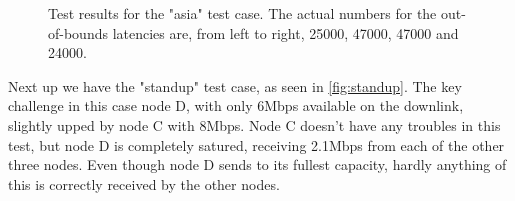 \begin{figure}
\begin{subfigure}[t]{.48\textwidth}
    \end{subfigure}
    \caption{Test results for the "asia" test case. The actual numbers for the out-of-bounds latencies are, from left to right, 25000, 47000, 47000 and 24000.}
    \label{fig:asia-bitrate}
\end{figure}

Next up we have the "standup" test case, as seen in \autoref{fig:standup}. The key challenge in this case node D, with only 6Mbps available on the downlink, slightly upped by node C with 8Mbps. Node C doesn't have any troubles in this test, but node D is completely satured, receiving 2.1Mbps from each of the other three nodes. Even though node D sends to its fullest capacity, hardly anything of this is correctly received by the other nodes.

